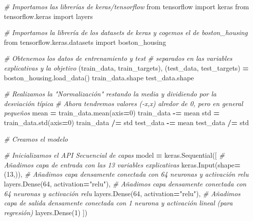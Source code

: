 \documentclass[
  a4paper,
  DIV=11,
  numbers=noendperiod]{scrreprt}
\newenvironment{Shaded}{\begin{snugshade}}{\end{snugshade}}
\newcommand{\CommentTok}[1]{\textcolor[rgb]{0.56,0.35,0.01}{\textit{#1}}}
\newcommand{\DecValTok}[1]{\textcolor[rgb]{0.00,0.00,0.81}{#1}}
\newcommand{\ImportTok}[1]{#1}
\newcommand{\NormalTok}[1]{#1}
\newcommand{\OperatorTok}[1]{\textcolor[rgb]{0.81,0.36,0.00}{\textbf{#1}}}
\newcommand{\StringTok}[1]{\textcolor[rgb]{0.31,0.60,0.02}{#1}}
\begin{document}
\begin{Shaded}
\begin{Highlighting}[numbers=left,,]

\CommentTok{\# Importamos las librerías de keras/tensorflow}
\ImportTok{from}\NormalTok{ tensorflow }\ImportTok{import}\NormalTok{ keras}
\ImportTok{from}\NormalTok{ tensorflow.keras }\ImportTok{import}\NormalTok{ layers}

\CommentTok{\# Importamos la librería de los datasets de keras y cogemos el de boston\_housing}
\ImportTok{from}\NormalTok{ tensorflow.keras.datasets }\ImportTok{import}\NormalTok{ boston\_housing}

\CommentTok{\# Obtenemos los datos de entrenamiento y test}
\CommentTok{\# separados en las variables explicativas y la objetivo}
\NormalTok{(train\_data, train\_targets), (test\_data, test\_targets) }\OperatorTok{=}\NormalTok{ boston\_housing.load\_data()}
\NormalTok{train\_data.shape}
\NormalTok{test\_data.shape}

\CommentTok{\# Realizamos la "Normalización" restando la media y dividiendo por la desviación típica}
\CommentTok{\# Ahora tendremos valores ({-}x,x) alredor de 0, pero en general pequeños}
\NormalTok{mean }\OperatorTok{=}\NormalTok{ train\_data.mean(axis}\OperatorTok{=}\DecValTok{0}\NormalTok{)}
\NormalTok{train\_data }\OperatorTok{{-}=}\NormalTok{ mean}
\NormalTok{std }\OperatorTok{=}\NormalTok{ train\_data.std(axis}\OperatorTok{=}\DecValTok{0}\NormalTok{)}
\NormalTok{train\_data }\OperatorTok{/=}\NormalTok{ std}
\NormalTok{test\_data }\OperatorTok{{-}=}\NormalTok{ mean}
\NormalTok{test\_data }\OperatorTok{/=}\NormalTok{ std}

\CommentTok{\# Creamos el modelo}

\CommentTok{\# Inicializamos el API Secuencial de capas}
\NormalTok{model }\OperatorTok{=}\NormalTok{ keras.Sequential([}
        \CommentTok{\# Añadimos capa de entrada con las 13 variables explicativas}
\NormalTok{        keras.Input(shape}\OperatorTok{=}\NormalTok{(}\DecValTok{13}\NormalTok{,)),}
        \CommentTok{\# Añadimos capa densamente conectada con 64 neuronas y activación relu}
\NormalTok{        layers.Dense(}\DecValTok{64}\NormalTok{, activation}\OperatorTok{=}\StringTok{"relu"}\NormalTok{),}
        \CommentTok{\# Añadimos capa densamente conectada con 64 neuronas y activación relu}
\NormalTok{        layers.Dense(}\DecValTok{64}\NormalTok{, activation}\OperatorTok{=}\StringTok{"relu"}\NormalTok{),}
        \CommentTok{\# Añadimos capa de salida densamente conectada con 1 neurona y activación lineal (para regresión)}
\NormalTok{        layers.Dense(}\DecValTok{1}\NormalTok{)}
\NormalTok{    ])}


\end{Highlighting}
\end{Shaded}
\end{document}
